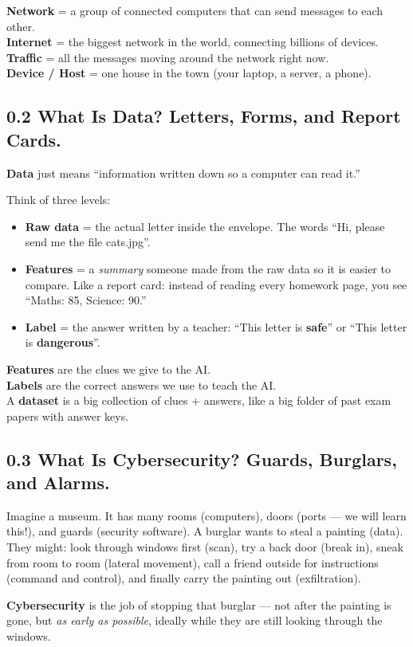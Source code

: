 \documentclass[11pt,a4paper]{article}
\begin{document}
\begin{jargonbox}
\textbf{Network} = a group of connected computers that can send messages to
each other.\\
\textbf{Internet} = the biggest network in the world, connecting billions of
devices.\\
\textbf{Traffic} = all the messages moving around the network right now.\\
\textbf{Device / Host} = one house in the town (your laptop, a server, a phone).
\end{jargonbox}

\subsection{0.2 What Is Data? Letters, Forms, and Report Cards.}

\textbf{Data} just means ``information written down so a computer can read it.''

Think of three levels:
\begin{itemize}[leftmargin=1.6em,itemsep=2pt]
  \item \textbf{Raw data} = the actual letter inside the envelope. The words
        ``Hi, please send me the file cats.jpg''.
  \item \textbf{Features} = a \emph{summary} someone made from the raw data so
        it is easier to compare. Like a report card: instead of reading every
        homework page, you see ``Maths: 85, Science: 90.''
  \item \textbf{Label} = the answer written by a teacher: ``This letter is
        \textbf{safe}'' or ``This letter is \textbf{dangerous}''.
\end{itemize}

\begin{keybox}
\textbf{Features} are the clues we give to the AI.\\
\textbf{Labels} are the correct answers we use to teach the AI.\\
A \textbf{dataset} is a big collection of clues + answers, like a big folder
of past exam papers with answer keys.
\end{keybox}

\subsection{0.3 What Is Cybersecurity? Guards, Burglars, and Alarms.}

\begin{storybox}
Imagine a museum. It has many rooms (computers), doors (ports --- we will learn
this!), and guards (security software). A burglar wants to steal a painting
(data). They might: look through windows first (scan), try a back door
(break in), sneak from room to room (lateral movement), call a friend outside
for instructions (command and control), and finally carry the painting out
(exfiltration).

\textbf{Cybersecurity} is the job of stopping that burglar --- not after the
painting is gone, but \emph{as early as possible}, ideally while they are
still looking through the windows.
\end{storybox}
\end{document}
